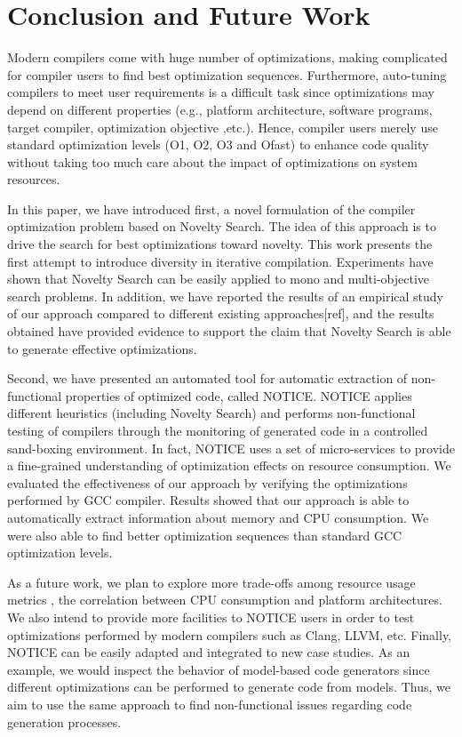 \section{Conclusion and Future Work}
Modern compilers come with huge number of optimizations, making complicated for compiler users to find best optimization sequences. Furthermore, auto-tuning compilers to meet user requirements is a difficult task since optimizations may depend on different properties (e.g., platform architecture, software programs, target compiler, optimization objective ,etc.).
Hence, compiler users merely use standard optimization levels (O1, O2, O3 and Ofast) to enhance code quality without taking too much care about the impact of optimizations on system resources.

In this paper, we have introduced first, a novel formulation of the compiler optimization problem based on Novelty Search. The idea of this approach is to drive the search for best optimizations toward novelty. This work presents the first attempt to introduce diversity in iterative compilation. Experiments have shown that Novelty Search can be easily applied to mono and multi-objective search problems. In addition, we have reported the results of an empirical study of our approach compared to different existing approaches[ref], and the results obtained have provided evidence to support the claim that Novelty Search is able to generate effective optimizations.

Second, we have presented an automated tool for automatic extraction of non-functional properties of optimized code, called NOTICE. NOTICE applies different heuristics (including Novelty Search) and performs non-functional testing of compilers through the monitoring of generated code in a controlled sand-boxing environment. In fact, NOTICE uses a set of micro-services to provide a fine-grained understanding of optimization effects on resource consumption. 
We evaluated the effectiveness of our approach by verifying the optimizations performed by GCC compiler. 
Results showed that our approach is able to automatically extract information about memory and CPU consumption. We were also able to find better optimization sequences than standard GCC optimization levels.

As a future work, we plan to explore more trade-offs among resource usage metrics \eg, the correlation between CPU consumption and platform architectures. 
We also intend to provide more facilities to NOTICE users in order to test optimizations performed by modern compilers such as Clang, LLVM, etc.
Finally, NOTICE can be easily adapted and integrated to new case studies. As an example, we would inspect the behavior of model-based code generators since different optimizations can be performed to generate code from models\cite{stuermer2007systematic}. Thus, we aim to use the same approach to find non-functional issues regarding code generation processes.



